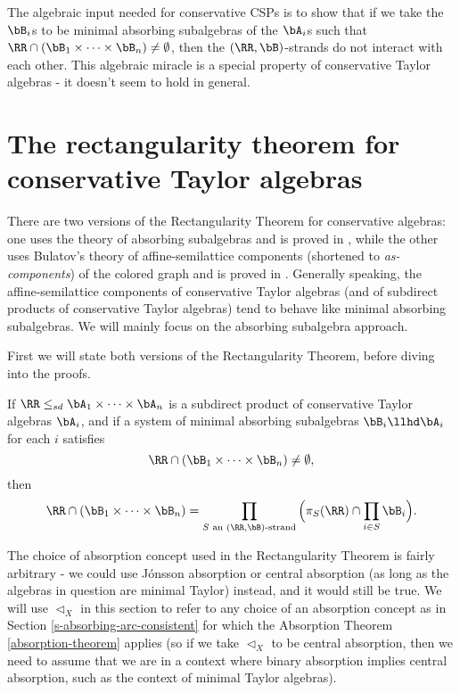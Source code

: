 The algebraic input needed for conservative CSPs is to show that if we take the $\bB_i$s to be minimal absorbing subalgebras of the $\bA_i$s such that $\RR \cap (\bB_1 \times \cdots \times \bB_n) \ne \emptyset$, then the $(\RR,\bB)$-strands do not interact with each other. This algebraic miracle is a special property of conservative Taylor algebras - it doesn't seem to hold in general.%


\section{The rectangularity theorem for conservative Taylor algebras}

There are two versions of the Rectangularity Theorem for conservative algebras: one uses the theory of absorbing subalgebras and is proved in \cite{barto-conservative-revisited}, while the other uses Bulatov's theory of affine-semilattice components (shortened to \emph{as-components}) of the colored graph and is proved in \cite{bulatov-conservative-rerevisited}. Generally speaking, the affine-semilattice components of conservative Taylor algebras (and of subdirect products of conservative Taylor algebras) tend to behave like minimal absorbing subalgebras. We will mainly focus on the absorbing subalgebra approach.

First we will state both versions of the Rectangularity Theorem, before diving into the proofs.

\begin{thm}\label{thm-rectangularity-conservative-absorbing} If $\RR \le_{sd} \bA_1 \times \cdots \times \bA_n$ is a subdirect product of conservative Taylor algebras $\bA_i$, and if a system of minimal absorbing subalgebras $\bB_i \llhd \bA_i$ for each $i$ satisfies
\[
\RR \cap (\bB_1 \times \cdots \times \bB_n) \ne \emptyset,
\]
then
\[
\RR \cap (\bB_1 \times \cdots \times \bB_n) = \prod_{S\text{ an }(\RR,\bB)\text{-strand}} \Big(\pi_S(\RR) \cap \prod_{i\in S}\bB_i\Big).
\]
\end{thm}

The choice of absorption concept used in the Rectangularity Theorem is fairly arbitrary - we could use J\'onsson absorption or central absorption (as long as the algebras in question are minimal Taylor) instead, and it would still be true. We will use $\lhd_X$ in this section to refer to any choice of an absorption concept as in Section \ref{s-absorbing-arc-consistent} for which the Absorption Theorem \ref{absorption-theorem} applies (so if we take $\lhd_X$ to be central absorption, then we need to assume that we are in a context where binary absorption implies central absorption, such as the context of minimal Taylor algebras).

